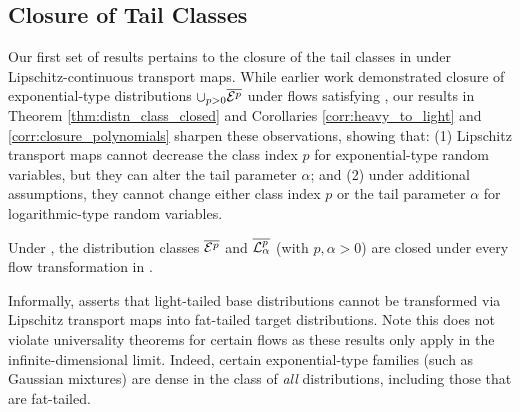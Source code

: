 \documentclass[../../thesis.tex]{subfiles}
\begin{document}
\subsection{Closure of Tail Classes}
\label{ssec:failure}

Our first set of results pertains to the closure of the tail classes in 
under Lipschitz-continuous transport maps. While earlier work \citep{jaini2020tails} demonstrated
closure of exponential-type distributions $\cup_{p > 0} \overline{\mathcal{E}^p}$ under flows satisfying , our results in Theorem \ref{thm:distn_class_closed} and Corollaries \ref{corr:heavy_to_light} and \ref{corr:closure_polynomials} sharpen these observations, showing that: (1) Lipschitz transport maps cannot decrease the class index $p$ for exponential-type random variables, but they can alter the tail parameter $\alpha$; and
(2) under additional assumptions, they cannot change either class index $p$ or the tail parameter $\alpha$ for logarithmic-type random variables.

\begin{theorem}
  \label{thm:distn_class_closed}
  Under ,
  the distribution classes $\overline{\mathcal{E}^p}$
  and $\overline{\mathcal{L}^p_\alpha}$ (with $p,\alpha > 0$) are closed
  under every flow transformation in .
\end{theorem}

Informally,  asserts that light-tailed base distributions cannot be transformed
via Lipschitz transport maps into fat-tailed target distributions.
Note this does not violate universality theorems for certain flows \citep{huang2018neural}
as these results only apply in the infinite-dimensional limit. Indeed, certain exponential-type families (such as Gaussian mixtures) are dense in the class of \emph{all} distributions, including those that are fat-tailed.
\end{document}
